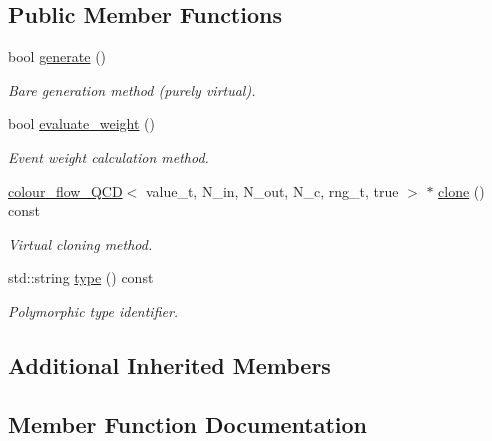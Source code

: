 \subsection*{Public Member Functions}
\begin{DoxyCompactItemize}
\item 
bool \hyperlink{a00076_a758cb255768b46448282e56ce58f5a64}{generate} ()
\begin{DoxyCompactList}\small\item\em \textquotesingle{}Bare generation\textquotesingle{} method (purely virtual). \end{DoxyCompactList}\item 
\hypertarget{a00076_ad7b29c1d8d72548db18285f2f5063a4a}{}bool \hyperlink{a00076_ad7b29c1d8d72548db18285f2f5063a4a}{evaluate\+\_\+weight} ()\label{a00076_ad7b29c1d8d72548db18285f2f5063a4a}

\begin{DoxyCompactList}\small\item\em Event weight calculation method. \end{DoxyCompactList}\item 
\hypertarget{a00076_a755b30fff75032ca9e7bbb17df093860}{}\hyperlink{a00074}{colour\+\_\+flow\+\_\+\+Q\+C\+D}$<$ value\+\_\+t, N\+\_\+in, N\+\_\+out, N\+\_\+c, rng\+\_\+t, true $>$ $\ast$ \hyperlink{a00076_a755b30fff75032ca9e7bbb17df093860}{clone} () const \label{a00076_a755b30fff75032ca9e7bbb17df093860}

\begin{DoxyCompactList}\small\item\em Virtual cloning method. \end{DoxyCompactList}\item 
\hypertarget{a00076_afc00054d20838997be06a21feb415ae6}{}std\+::string \hyperlink{a00076_afc00054d20838997be06a21feb415ae6}{type} () const \label{a00076_afc00054d20838997be06a21feb415ae6}

\begin{DoxyCompactList}\small\item\em Polymorphic type identifier. \end{DoxyCompactList}\end{DoxyCompactItemize}
\subsection*{Additional Inherited Members}


\subsection{Member Function Documentation}
\hypertarget{a00076_a758cb255768b46448282e56ce58f5a64}{}
